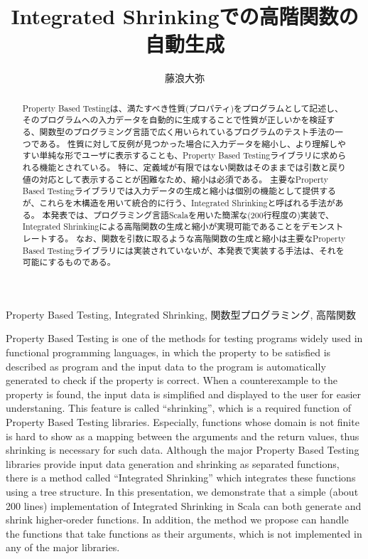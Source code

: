 \documentclass[submit,PRO]{ipsj}
\title{Integrated Shrinkingでの高階関数の自動生成}
\author{藤浪大弥}{FUJINAMI Hiroya}{NihonUCHS}[fnamty.js@gmail.com]
\theoremstyle{definition}
\begin{document}
\begin{abstract}
  Property Based Testingは、満たすべき性質(プロパティ)をプログラムとして記述し、そのプログラムへの入力データを自動的に生成することで性質が正しいかを検証する、関数型のプログラミング言語で広く用いられているプログラムのテスト手法の一つである。
  性質に対して反例が見つかった場合に入力データを縮小し、より理解しやすい単純な形でユーザに表示することも、Property Based Testingライブラリに求められる機能とされている。
  特に、定義域が有限ではない関数はそのままでは引数と戻り値の対応として表示することが困難なため、縮小は必須である。
  主要なProperty Based Testingライブラリでは入力データの生成と縮小は個別の機能として提供するが、これらを木構造を用いて統合的に行う、Integrated Shrinkingと呼ばれる手法がある。
  本発表では、プログラミング言語Scalaを用いた簡潔な(200行程度の)実装で、Integrated Shrinkingによる高階関数の生成と縮小が実現可能であることをデモンストレートする。
  なお、関数を引数に取るような高階関数の生成と縮小は主要なProperty Based Testingライブラリには実装されていないが、本発表で実装する手法は、それを可能にするものである。
\end{abstract}

\begin{jkeyword}
  Property Based Testing, Integrated Shrinking, 関数型プログラミング, 高階関数
\end{jkeyword}


\begin{eabstract}
  Property Based Testing is one of the methods for testing programs widely used in functional programming languages, in which the property to be satisfied is described as program and the input data to the program is automatically generated to check if the property is correct.
  When a counterexample to the property is found, the input data is simplified and displayed to the user for easier understaning. This feature is called ``shrinking'', which is a required function of Property Based Testing libraries.
  Especially, functions whose domain is not finite is hard to show as a mapping between the arguments and the return values, thus shrinking is necessary for such data.
  Although the major Property Based Testing libraries provide input data generation and shrinking as separated functions, there is a method called ``Integrated Shrinking'' which integrates these functions using a tree structure.
  In this presentation, we demonstrate that a simple (about 200 lines) implementation of Integrated Shrinking in Scala can both generate and shrink higher-oreder functions.
  In addition, the method we propose can handle the functions that take functions as their arguments, which is not implemented in any of the major libraries.
\end{eabstract}
\end{document}
